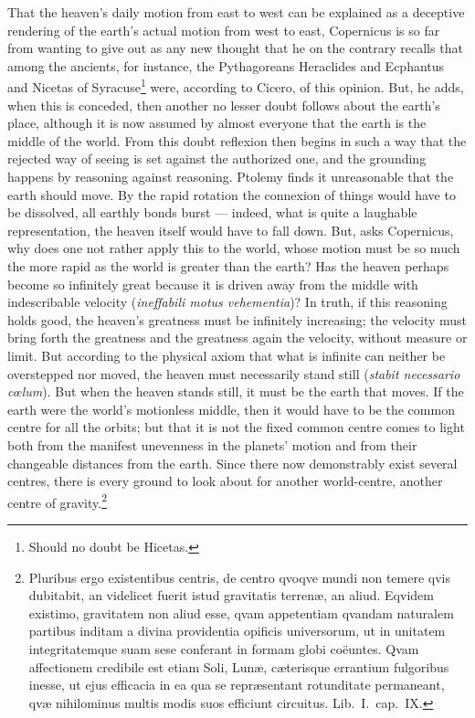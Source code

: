 \documentclass[12pt,a4paper]{book}
\begin{document}
That the heaven's daily motion from east to west can be explained as a deceptive rendering of the earth's
actual motion from west to east, Copernicus is so far from wanting to give out as any new thought that he
on the contrary recalls that among the ancients, for instance, the Pythagoreans Heraclides and Ecphantus
and Nicetas of Syracuse\footnote{%
Should no doubt be Hicetas.} were, according to Cicero, of this opinion. But, he adds, when this is
conceded, then another no lesser doubt follows about the earth's place, although it is now assumed by almost
everyone that the earth is the middle of the world. From this doubt reflexion then begins in such a way that
the rejected way of seeing is set against the authorized one, and the grounding happens by reasoning against
reasoning. Ptolemy finds it unreasonable that the earth should move. By the rapid rotation the connexion of
things would have to be dissolved, all earthly bonds burst --- indeed, what is quite a laughable
representation, the heaven itself would have to fall down. But, asks Copernicus, why does one not rather
apply this to the world, whose motion must be so much the more rapid as the world is greater than the earth?
Has the heaven perhaps become so infinitely great because it is driven away from the middle with
indescribable velocity (\textit{ineffabili motus vehementia})? In truth, if this reasoning holds good, the
heaven's greatness must be infinitely increasing; the velocity must bring forth the greatness and the
greatness again the velocity, without measure or limit. But according to the physical axiom that what is
infinite can neither be overstepped nor moved, the heaven must necessarily stand still (\textit{stabit
necessario cœlum}). But when the heaven stands
still, it must be the earth that moves. If the earth were the world's motionless middle, then it
would have to be the common centre for all the orbits; but that it is not the fixed common centre
comes to light both from the manifest unevenness in the planets' motion and from their changeable
distances from the earth. Since there now demonstrably exist several centres, there is every ground
to look about for another world-centre, another centre of
gravity.\footnote{%
Pluribus ergo existentibus centris, de centro qvoqve mundi non temere qvis dubitabit, an videlicet
fuerit istud gravitatis terrenæ, an aliud. Eqvidem existimo, gravitatem non aliud esse, qvam
appetentiam qvandam naturalem partibus inditam a divina providentia opificis universorum, ut in
unitatem integritatemque suam sese conferant in formam globi coëuntes. Qvam affectionem credibile
est etiam Soli, Lunæ, cæterisque errantium fulgoribus inesse, ut ejus efficacia in ea qua se
repræsentant rotunditate permaneant, qvæ nihilominus multis modis suos efficiunt circuitus. Lib.\ I.\
cap.\ IX.}
\end{document}
